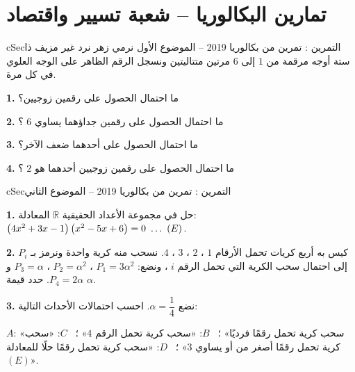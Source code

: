 \documentclass[12pt,a4paper]{article}
\newenvironment{BOX}[2]{\begin{otherlanguage}{english}\begin{arbox}{#1}{#2}}{\end{arbox}\end{otherlanguage}}
\newcounter{exo}
\newenvironment{tamrin}[1]{\stepcounter{exo}\begin{BOX}{cSec}{التمرين \theexo: #1}}{\end{BOX}}
\renewcommand{\ldots}{\mathinner{\ldotp\ldotp\ldotp}}
\newcommand{\R}{\mathbb{R}}
\newcommand{\QQ}[1]{\par\smallskip\textbf{#1.} }
\begin{document}
\section{تمارين البكالوريا -- شعبة تسيير واقتصاد}
\begin{tamrin}{تمرين من بكالوريا 2019 -- الموضوع الأول}
نرمي زهر نرد غير مزيف ذا ستة أوجه مرقمة من $1$ إلى $6$ مرتين متتاليتين ونسجل الرقم الظاهر على الوجه العلوي في كل مرة.
\QQ{1} ما احتمال الحصول على رقمين زوجيين؟
\QQ{2} ما احتمال الحصول على رقمين جداؤهما يساوي $6$ ؟
\QQ{3} ما احتمال الحصول على أحدهما ضعف الآخر؟
\QQ{4} ما احتمال الحصول على رقمين زوجيين أحدهما هو $2$ ؟
\end{tamrin}
\begin{tamrin}{تمرين من بكالوريا 2019 -- الموضوع الثاني}
\QQ{1} حل في مجموعة الأعداد الحقيقية $\R$ المعادلة: $\left(4x^2+3x-1\right)\left(x^2-5x+6\right)=0\ \ldots\ (E)$.
\QQ{2} كيس به أربع كريات تحمل الأرقام $1$ ، $2$ ، $3$ ، $4$. نسحب منه كرية واحدة ونرمز بـ $P_i$ إلى احتمال سحب الكرية التي تحمل الرقم $i$ ، ونضع: $P_1=3\alpha^2$ ، $P_2=\alpha^2$ ، $P_3=\alpha$ و $P_4=2\alpha$. حدد قيمة $\alpha$.
\QQ{3} نضع $\alpha=\dfrac14$. احسب احتمالات الأحداث التالية:
\par $A$: «سحب كرية تحمل رقمًا فرديًا» ؛ \ $B$: «سحب كرية تحمل الرقم $4$» ؛ \ $C$: «سحب كرية تحمل رقمًا أصغر من أو يساوي $3$» ؛ \ $D$: «سحب كرية تحمل رقمًا حلًا للمعادلة $(E)$».
\end{tamrin}
\end{document}
